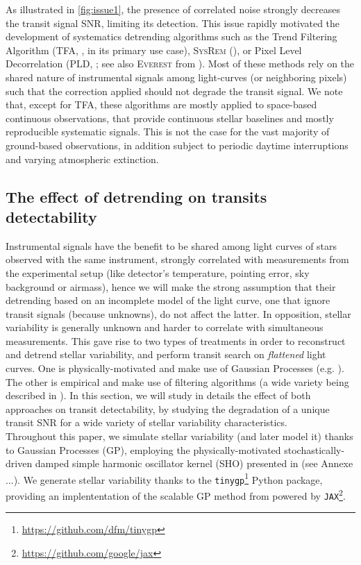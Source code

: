 \documentclass{aastex631}
\begin{document}
As illustrated in \autoref{fig:issue1}, the presence of correlated noise strongly decreases the transit signal SNR, limiting its detection. This issue rapidly motivated the development of systematics detrending algorithms such as the Trend Filtering Algorithm (\textsc{TFA}, \citealt{tfa}, in its primary use case), \textsc{SysRem} (\citealt{sysrem}), or Pixel Level Decorrelation (\textsc{PLD}, \citealt{pld}; see also \textsc{Everest} from \citealt{everest1, everest2}). Most of these methods rely on the shared nature of instrumental signals among light-curves (or neighboring pixels) such that the correction applied should not degrade the transit signal. We note that, except for \textsc{TFA}, these algorithms are mostly applied to space-based continuous observations, that provide continuous stellar baselines and mostly reproducible systematic signals. This is not the case for the vast majority of ground-based observations, in addition subject to periodic daytime interruptions and varying atmospheric extinction.

\subsection{The effect of detrending on transits detectability}

Instrumental signals have the benefit to be shared among light curves of stars observed with the same instrument, strongly correlated with measurements from the experimental setup (like detector's temperature, pointing error, sky background or airmass), hence we will make the strong assumption that their detrending based on an incomplete model of the light curve, one that ignore transit signals (because unknowns), do not affect the latter. In opposition, stellar variability is generally unknown and harder to correlate with simultaneous measurements. This gave rise to two types of treatments in order to reconstruct and detrend stellar variability, and perform transit search on \textit{flattened} light curves. One is physically-motivated and make use of Gaussian Processes (e.g. \cite{k2sc}). The other is empirical and make use of filtering algorithms (a wide variety being described in \cite{wotan}). In this section, we will study in details the effect of both approaches on transit detectability, by studying the degradation of a unique transit SNR for a wide variety of stellar variability characteristics.\\

Throughout this paper, we simulate stellar variability (and later model it) thanks to Gaussian Processes (GP), employing the physically-motivated stochastically-driven damped simple harmonic oscillator kernel (SHO) presented in \citealt{celerite1} (see Annexe ...). We generate stellar variability thanks to the \texttt{tinygp}\footnote{\href{https://github.com/dfm/tinygp}{https://github.com/dfm/tinygp}} Python package, providing an implententation of the scalable GP method from \citealt{celerite2} powered by \texttt{JAX}\footnote{\href{https://github.com/google/jax}{https://github.com/google/jax}}.
\end{document}
